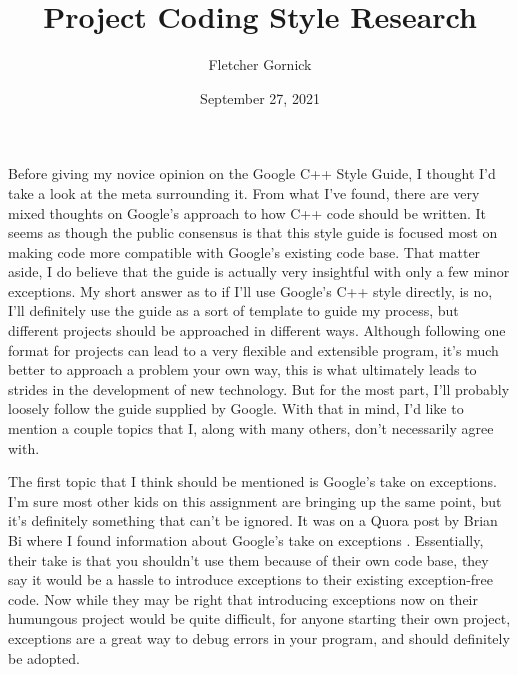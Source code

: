 \documentclass[11pt]{article}
\title{Project Coding Style Research}
\author{Fletcher Gornick}
\date{September 27, 2021}
\begin{document}
\maketitle

Before giving my novice opinion on the Google C++ Style Guide, I thought I'd take a look at the 
meta surrounding it.  From what I've found, there are very mixed thoughts on Google's approach 
to how C++ code should be written.  It seems as though the public consensus is that this style 
guide is focused most on making code more compatible with Google's existing code base.  That 
matter aside, I do believe that the guide is actually very insightful with only a few minor 
exceptions.  My short answer as to if I'll use Google's C++ style directly, is no, I'll definitely 
use the guide as a sort of template to guide my process, but different projects should be approached 
in different ways.  Although following one format for projects can lead to a very flexible and 
extensible program, it's much better to approach a problem your own way, this is what ultimately 
leads to strides in the development of new technology.  But for the most part, I'll probably loosely 
follow the guide supplied by Google.  With that in mind, I'd like to mention a couple topics that 
I, along with many others, don't necessarily agree with. 

The first topic that I think should be mentioned is Google's take on exceptions.  I'm sure most 
other kids on this assignment are bringing up the same point, but it's definitely something that 
can't be ignored.  It was on a Quora post by Brian Bi where I found information about Google's 
take on exceptions \cite{brian}.  Essentially, their take is that you shouldn't use them because 
of their own code base, they say it would be a hassle to introduce exceptions to their existing 
exception-free code.  Now while they may be right that introducing exceptions now on their humungous 
project would be quite difficult, for anyone starting their own project, exceptions are a great way 
to debug errors in your program, and should definitely be adopted.



\end{document}
